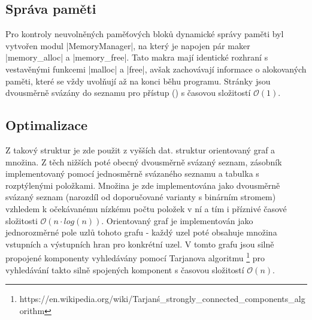 \subsection{Správa paměti}
Pro kontroly neuvolněných paměťových bloků dynamické správy paměti byl vytvořen modul \ic|MemoryManager|, na který je napojen pár maker \ic|memory_alloc| a \ic|memory_free|. Tato makra mají identické rozhraní s vestavěnými funkcemi \ic|malloc| a \ic|free|, avšak zachovávají informace o alokovaných  paměti, které se vždy uvolňují až na konci běhu programu. Stránky jsou dvousměrně svázány do seznamu pro přístup () s časovou složitostí $\mathcal{O}(1)$.

\subsection{Optimalizace}
Z takový struktur je zde použit z vyšších dat. struktur orientovaný graf a množina. Z těch nižších poté obecný dvousměrně svázaný seznam, zásobník implementovaný pomocí jednosměrně svázaného seznamu a tabulka s rozptýlenými položkami. Množina je zde implementována jako dvousměrně svázaný seznam (narozdíl od doporučované varianty s binárním stromem) vzhledem k očekávanému nízkému počtu položek v ní a tím i příznivé časové složitosti $\mathcal{O}(n\cdot log(n))$. Orientovaný graf je implementován jako jednorozměrné pole uzlů tohoto grafu - každý uzel poté obsahuje množina vstupních a výstupních hran pro konkrétní uzel. V tomto grafu jsou silně propojené komponenty vyhledávány pomocí Tarjanova algoritmu \footnote{https://en.wikipedia.org/wiki/Tarjan\'s\_strongly\_connected\_components\_algorithm} pro vyhledávání takto silně spojených komponent s časovou složitostí $\mathcal{O}(n)$.